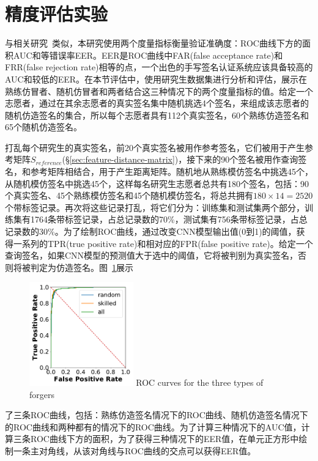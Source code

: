 \section{精度评估实验}
\label{sec:accuracy-experiment}

与相关研究~\cite{fischer2015robust,levy2018handwritten}类似，本研究使用两个度量指标衡量验证准确度：ROC曲线下方的面积AUC和等错误率EER。EER是ROC曲线中FAR(false acceptance rate)和FRR(false rejection rate)相等的点，一个出色的手写签名认证系统应该具备较高的AUC和较低的EER。在本节评估中，使用研究生数据集进行分析和评估，展示在熟练仿冒者、随机仿冒者和两者结合这三种情况下的两个度量指标的值。给定一个志愿者，通过在其余志愿者的真实签名集中随机挑选4个签名，来组成该志愿者的随机仿造签名的集合，所以每个志愿者具有112个真实签名，60个熟练仿造签名和65个随机仿造签名。

打乱每个研究生的真实签名，前20个真实签名被用作参考签名，它们被用于产生参考矩阵$S_{reference}$(\S\ref{sec:feature-distance-matrix})，接下来的90个签名被用作查询签名，和参考矩阵相结合，用于产生距离矩阵。随机地从熟练模仿签名中挑选45个，从随机模仿签名中挑选45个，这样每名研究生志愿者总共有180个签名，包括：90个真实签名、45个熟练模仿签名和45个随机模仿签名，将总共拥有$180\times 14=2520$个带标签记录。再次将这些记录打乱，将它们分为：训练集和测试集两个部分，训练集有1764条带标签记录，占总记录数的70\%，测试集有756条带标签记录，占总记录数的30\%。为了绘制ROC曲线，通过改变CNN模型输出值(0到1)的阈值，获得一系列的TPR(true positive rate)和相对应的FPR(false positive rate)。给定一个查询签名，如果CNN模型的预测值大于选中的阈值，它将被判别为真实签名，否则将被判定为仿造签名。图~\ref{fig:roc-forgers}展示
\begin{figure}[!htp]
  \centering
  \includegraphics[width=0.4\textwidth]{figure/mimic-random-total-ROC-curves.pdf}
      {ROC curves for the three types of forgers}
  \label{fig:roc-forgers}
\end{figure}
了三条ROC曲线，包括：熟练仿造签名情况下的ROC曲线、随机仿造签名情况下的ROC曲线和两种都有的情况下的ROC曲线。为了计算三种情况下的AUC值，计算三条ROC曲线下方的面积，为了获得三种情况下的EER值，在单元正方形中绘制一条主对角线，从该对角线与ROC曲线的交点可以获得EER值。

